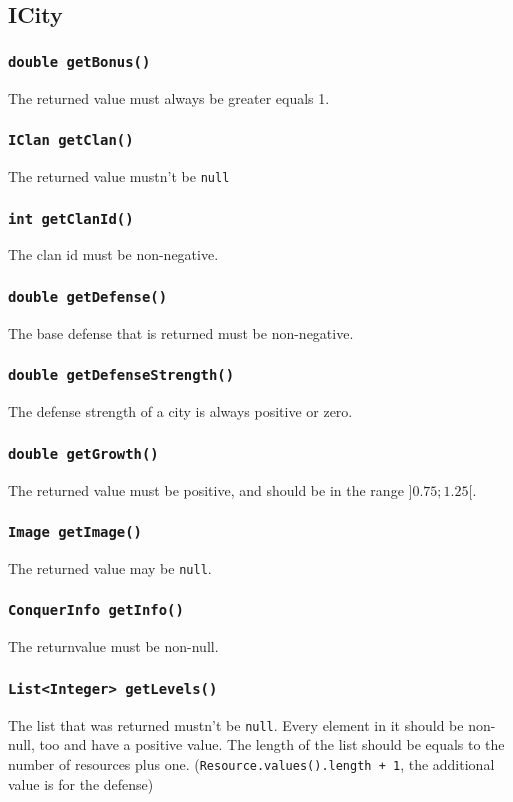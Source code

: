 \documentclass{article}
\begin{document}
\subsection{ICity}

\subsubsection{\texttt{double getBonus()}}
The returned value must always be greater equals 1.

\subsubsection{\texttt{IClan getClan()}}
The returned value mustn't be \texttt{null}

\subsubsection{\texttt{int getClanId()}}
The clan id must be non-negative.

\subsubsection{\texttt{double getDefense()}}
The base defense that is returned must be non-negative.

\subsubsection{\texttt{double getDefenseStrength()}}
The defense strength of a city is always positive or zero.

\subsubsection{\texttt{double getGrowth()}}
The returned value must be positive, and should be in the range $]0.75;1.25[$.

\subsubsection{\texttt{Image getImage()}}
The returned value may be \texttt{null}.

\subsubsection{\texttt{ConquerInfo getInfo()}}
The returnvalue must be non-null.

\subsubsection{\texttt{List<Integer> getLevels()}}
The list that was returned mustn't be \texttt{null}. Every element in it
should be non-null, too and have a positive value.
The length of the list should be equals to the number of resources plus one.
(\texttt{Resource.values().length + 1}, the additional value is for the defense)
\end{document}
